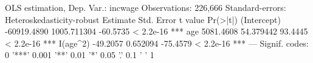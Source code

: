 \documentclass[12pt]{article}
\begin{document}
\begin{enumerate}
    \bigskip
    \begin{codeblock}[{}]
      OLS estimation, Dep. Var.: incwage
      Observations: 226,666
      Standard-errors: Heteroskedasticity-robust
      Estimate  Std. Error  t value  Pr(>|t|)
      (Intercept) -60919.4890 1005.711304 -60.5735 < 2.2e-16 ***
      age           5081.4608   54.379442  93.4445 < 2.2e-16 ***
      I(age^2)       -49.2057    0.652094 -75.4579 < 2.2e-16 ***
      ---
      Signif. codes:  0 '***' 0.001 '**' 0.01 '*' 0.05 '.' 0.1 ' ' 1
    \end{codeblock}

\end{enumerate}
\end{document}
